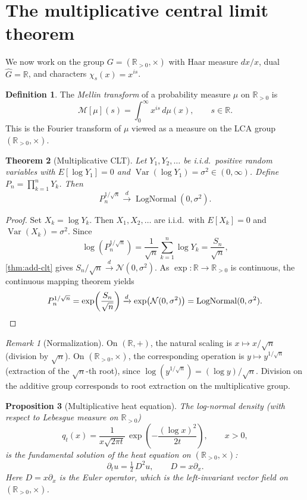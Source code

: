 \documentclass[12pt]{amsart}
\newtheorem{theorem}{Theorem}[section]
\newtheorem{proposition}[theorem]{Proposition}
\theoremstyle{definition}
\newtheorem{definition}[theorem]{Definition}
\theoremstyle{remark}
\newtheorem*{remark}{Remark}
\DeclareMathOperator{\Var}{Var}
\newcommand{\R}{\mathbb{R}}
\newcommand{\Rpos}{\mathbb{R}_{>0}}
\newcommand{\cN}{\mathcal{N}}
\newcommand{\cM}{\mathcal{M}}
\begin{document}
\section{The multiplicative central limit theorem}

We now work on the group $G = (\Rpos, \times)$ with Haar measure $dx/x$, dual $\widehat{G} = \R$, and characters $\chi_s(x) = x^{is}$.

\begin{definition}\label{def:mellin}
The \emph{Mellin transform} of a probability measure $\mu$ on $\Rpos$ is
\[
\cM[\mu](s) = \int_0^\infty x^{is}\, d\mu(x), \qquad s \in \R.
\]
This is the Fourier transform of $\mu$ viewed as a measure on the LCA group $(\Rpos, \times)$.
\end{definition}

\begin{theorem}[Multiplicative CLT]\label{thm:mult-clt}
Let $Y_1, Y_2, \ldots$ be i.i.d.\ positive random variables with $E[\log Y_1] = 0$ and $\Var(\log Y_1) = \sigma^2 \in (0, \infty)$. Define $P_n = \prod_{k=1}^n Y_k$. Then
\[
P_n^{1/\sqrt{n}} \xrightarrow{d} \operatorname{LogNormal}(0, \sigma^2).
\]
\end{theorem}

\begin{proof}
Set $X_k = \log Y_k$. Then $X_1, X_2, \ldots$ are i.i.d.\ with $E[X_k] = 0$ and $\Var(X_k) = \sigma^2$. Since
\[
\log\!\left(P_n^{1/\sqrt{n}}\right) = \frac{1}{\sqrt{n}} \sum_{k=1}^n \log Y_k = \frac{S_n}{\sqrt{n}},
\]
\cref{thm:add-clt} gives $S_n/\sqrt{n} \xrightarrow{d} \cN(0, \sigma^2)$. As $\exp : \R \to \Rpos$ is continuous, the continuous mapping theorem yields
\[
P_n^{1/\sqrt{n}} = \exp\!\left(\frac{S_n}{\sqrt{n}}\right) \xrightarrow{d} \exp\!\left(\cN(0, \sigma^2)\right) = \operatorname{LogNormal}(0, \sigma^2). \qedhere
\]
\end{proof}

\begin{remark}[Normalization]\label{rmk:normalization}
On $(\R, +)$, the natural scaling is $x \mapsto x/\sqrt{n}$ (division by $\sqrt{n}$). On $(\Rpos, \times)$, the corresponding operation is $y \mapsto y^{1/\sqrt{n}}$ (extraction of the $\sqrt{n}$-th root), since $\log(y^{1/\sqrt{n}}) = (\log y)/\sqrt{n}$. Division on the additive group corresponds to root extraction on the multiplicative group.
\end{remark}

\begin{proposition}[Multiplicative heat equation]\label{prop:heat-mult}
The log-normal density (with respect to Lebesgue measure on $\Rpos$)
\[
q_t(x) = \frac{1}{x\sqrt{2\pi t}}\, \exp\!\left(-\frac{(\log x)^2}{2t}\right), \qquad x > 0,
\]
is the fundamental solution of the heat equation on $(\Rpos, \times)$:
\begin{equation}\label{eq:heat-mult}
\partial_t u = \tfrac{1}{2}\, D^2 u, \qquad D = x\partial_x.
\end{equation}
Here $D = x\partial_x$ is the Euler operator, which is the left-invariant vector field on $(\Rpos, \times)$.
\end{proposition}
\end{document}
